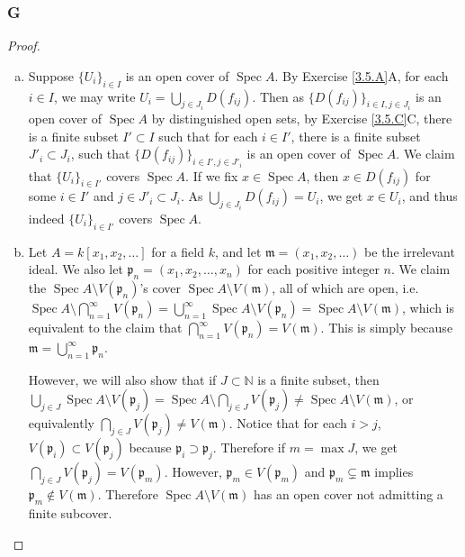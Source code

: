 \documentclass{article}
\newcommand{\N}{\mathbb{N}}
\newcommand{\frkm}{\mathfrak{m}}
\newcommand{\frkp}{\mathfrak{p}}
\DeclareMathOperator{\Spec}{\mathrm{Spec}}
\begin{document}
\subsubsection{G}\label{3.6.G}
\begin{proof}
    \begin{enumerate}[(a)]
        \item Suppose $\{U_i\}_{i\in I}$ is an open cover of $\Spec A$. By Exercise \ref{3.5.A}A, for each $i\in I$, we may write $U_i = \bigcup_{j\in J_i} D(f_{ij})$. Then as $\{D(f_{ij})\}_{i\in I, j\in J_i}$ is an open cover of $\Spec A$ by distinguished open sets, by Exercise \ref{3.5.C}C, there is a finite subset $I'\subset I$ such that for each $i\in I'$, there is a finite subset $J'_i \subset J_i$, such that $\{ D(f_{ij})\}_{i\in I', j\in J'_i}$ is an open cover of $\Spec A$. We claim that $\{U_i\}_{i\in I'}$ covers $\Spec A$. \iffalse For any $i\in I'$, we have
        \[
        U_i = U_i \cap \Spec A = \bigcup_{j\in J_i} D(f_{ij}) \cap \bigcup_{k\in I'} \bigcup_{j\in J'_k} D(f_{kj}).
        \]
        Thus
        \[
        \bigcup_{i\in I'} \bigcup_{j\in J_i} D(f_{ij}) \cap \bigcup_{k\in I'} \bigcup_{l\in J_{k}'} D(f_{kl}).
        \]
        \fi
        If we fix $x\in \Spec A$, then $x\in D(f_{ij})$ for some $i\in I'$ and $j\in J'_i \subset J_i$. As $ \bigcup_{j\in J_i} D(f_{ij})=U_i$, we get $x\in U_i$, and thus indeed $\{U_i\}_{i\in I'}$ covers $\Spec A$.
        \item Let $A=k[x_1,x_2,\dots]$ for a field $k$, and let $\frkm=(x_1,x_2,\dots)$ be the irrelevant ideal. We also let $\frkp_n=(x_1,x_2,\dots, x_n)$ for each positive integer $n$. We claim the $\Spec A \setminus V(\frkp_n)$'s cover $\Spec A \setminus V(\frkm)$, all of which are open, i.e. $\Spec A \setminus \bigcap_{n=1}^\infty V(\frkp_n)=\bigcup_{n=1}^\infty \Spec A \setminus V(\frkp_n) = \Spec A \setminus V(\frkm)$, which is equivalent to the claim that $\bigcap_{n=1}^\infty V(\frkp_n)=V(\frkm)$. This is simply because $\frkm= \bigcup_{n=1}^\infty \frkp_n$.

        However, we will also show that if $J\subset \N$ is a finite subset, then $\bigcup_{j\in J} \Spec A \setminus V(\frkp_j) = \Spec A \setminus \bigcap_{j\in J} V(\frkp_j) \ne \Spec A \setminus V(\frkm)$, or equivalently $\bigcap_{j\in J} V(\frkp_j) \ne V(\frkm)$. Notice that for each $i>j$, $V(\frkp_i)\subset V(\frkp_j)$ because $\frkp_i\supset \frkp_j$. Therefore if $m=\max J$, we get $\bigcap_{j\in J} V(\frkp_j)=V(\frkp_m)$. However, $\frkp_m\in V(\frkp_m)$ and $\frkp_m \subsetneq \frkm$ implies $\frkp_m \notin V(\frkm)$. Therefore $\Spec A \setminus V(\frkm)$ has an open cover not admitting a finite subcover.
    \end{enumerate}
\end{proof}
\end{document}
